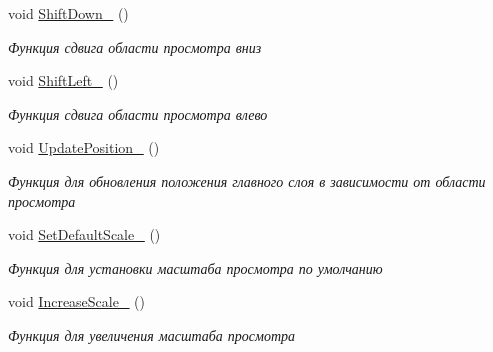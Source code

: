 \begin{DoxyCompactItemize}
\mbox{\label{classrtm_1_1_world_scene_a1add96021d1be8d8d7010b54b5cdcd39}} 
void \hyperlink{classrtm_1_1_world_scene_a1add96021d1be8d8d7010b54b5cdcd39}{Shift\+Down\+\_\+} ()
\begin{DoxyCompactList}\small\item\em Функция сдвига области просмотра вниз \end{DoxyCompactList}\item 
\mbox{\label{classrtm_1_1_world_scene_ad0925929f7cabc77b9ce5fafc9ad46ff}} 
void \hyperlink{classrtm_1_1_world_scene_ad0925929f7cabc77b9ce5fafc9ad46ff}{Shift\+Left\+\_\+} ()
\begin{DoxyCompactList}\small\item\em Функция сдвига области просмотра влево \end{DoxyCompactList}\item 
\mbox{\label{classrtm_1_1_world_scene_a8d27585fd9c96bace0fc38a3f2d4fb35}} 
void \hyperlink{classrtm_1_1_world_scene_a8d27585fd9c96bace0fc38a3f2d4fb35}{Update\+Position\+\_\+} ()
\begin{DoxyCompactList}\small\item\em Функция для обновления положения главного слоя в зависимости от области просмотра \end{DoxyCompactList}\item 
\mbox{\label{classrtm_1_1_world_scene_ada5bb74ead734e654e21186f8f23b997}} 
void \hyperlink{classrtm_1_1_world_scene_ada5bb74ead734e654e21186f8f23b997}{Set\+Default\+Scale\+\_\+} ()
\begin{DoxyCompactList}\small\item\em Функция для установки масштаба просмотра по умолчанию \end{DoxyCompactList}\item 
\mbox{\label{classrtm_1_1_world_scene_aad634dce96efa5d88d9a2c0383242402}} 
void \hyperlink{classrtm_1_1_world_scene_aad634dce96efa5d88d9a2c0383242402}{Increase\+Scale\+\_\+} ()
\begin{DoxyCompactList}\small\item\em Функция для увеличения масштаба просмотра \end{DoxyCompactList}\item 

\end{DoxyCompactItemize}
